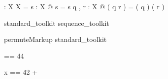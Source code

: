 \begin{gendef}[X]
\dcat : \seq \seq X \fun \seq X
\where
\dcat \langle \rangle = \langle \rangle
\also
\forall s : \seq X @ \dcat \langle s \rangle = s
\also
\forall q , r : \seq \seq X @ \dcat ( q \cat r ) = ( \dcat q ) \cat ( \dcat r )
\end{gendef}

\begin{zsection}
  \SECTION standard\_toolkit \parents sequence\_toolkit
\end{zsection}
\begin{zsection}
\SECTION permuteMarkup \parents standard\_toolkit
\end{zsection}
\begin{axdef}
\mynum == 44
\end{axdef}

\begin{axdef}
x == 42 + \mynum
\end{axdef}


